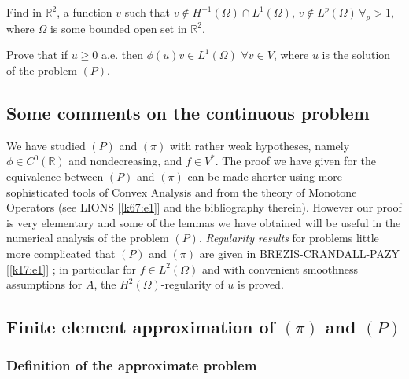 \begin{exercise}\label{c4:exer2.2}%
Find in $\mathbb{R}^2$, a function $v$ such that $v \notin H^{-1}(\Omega) \cap L^1(\Omega)$, $v \not \in L^p(\Omega)\, \forall_p > 1$, where $\Omega$ is some bounded open set in $\mathbb{R}^2$.
\end{exercise}

\begin{exercise}\label{c4:exer2.3}%
Prove that if $u \geq 0$ a.e. then $\phi (u) v \in L^1(\Omega)$  $\forall v \in V$, where $u$ is the solution of the problem $(P)$.
\end{exercise}

\subsection{Some comments on the continuous problem}\label{c4:ss2.4} 

We have studied $(P)$ and $(\pi)$ with rather weak hypotheses, namely
$\phi \in C^0(\mathbb{R})$ and nondecreasing, and $f \in V^*$. The
proof we have given for the equivalence between $(P)$ and $(\pi)$ can
be made shorter using more sophisticated tools of Convex Analysis and
from the theory of Monotone Operators (see LIONS [\ref{k67:e1}] and the
bibliography therein). However our proof is very elementary and some
of the lemmas we have obtained will be useful in the numerical
analysis of the problem $(P)$. \textit{Regularity results} for
problems little more complicated that $(P)$ and $(\pi)$ are given in
BREZIS-CRANDALL-PAZY [\ref{k17:e1}] ; in particular for $f \in L^2(\Omega)$ and
with convenient smoothness assumptions for $A$, the
$H^2(\Omega)$-regularity of $u$ is proved.  

\subsection{Finite element approximation of $(\pi)$ and $(P)$}\label{c4:ss2.5}

\subsubsection{Definition of the approximate
  problem}\label{c4:sss2.5.1}\pageoriginale   

